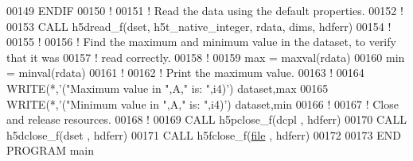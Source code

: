 \begin{DoxyCode}
00149 \textcolor{keywordflow}{  ENDIF}
00150   \textcolor{comment}{!}
00151   \textcolor{comment}{! Read the data using the default properties.}
00152   \textcolor{comment}{!}
00153   \textcolor{keyword}{CALL }h5dread\_f(dset, h5t\_native\_integer, rdata, dims, hdferr)
00154   \textcolor{comment}{!}
00155   \textcolor{comment}{!}
00156   \textcolor{comment}{! Find the maximum and minimum value in the dataset, to verify that it was}
00157   \textcolor{comment}{! read correctly.}
00158   \textcolor{comment}{!}
00159   max = maxval(rdata)
00160   min = minval(rdata)
00161   \textcolor{comment}{!}
00162   \textcolor{comment}{! Print the maximum value.}
00163   \textcolor{comment}{!}
00164   \textcolor{keyword}{WRITE}(*,\textcolor{stringliteral}{'("Maximum value in ",A," is: ",i4)'}) dataset,max
00165   \textcolor{keyword}{WRITE}(*,\textcolor{stringliteral}{'("Minimum value in ",A," is: ",i4)'}) dataset,min
00166   \textcolor{comment}{!}
00167   \textcolor{comment}{! Close and release resources.}
00168   \textcolor{comment}{!}
00169   \textcolor{keyword}{CALL }h5pclose\_f(dcpl , hdferr)
00170   \textcolor{keyword}{CALL }h5dclose\_f(dset , hdferr)
00171   \textcolor{keyword}{CALL }h5fclose\_f(\hyperlink{structfile}{file} , hdferr)
00172 
00173 \textcolor{keyword}{END PROGRAM }main
\end{DoxyCode}
